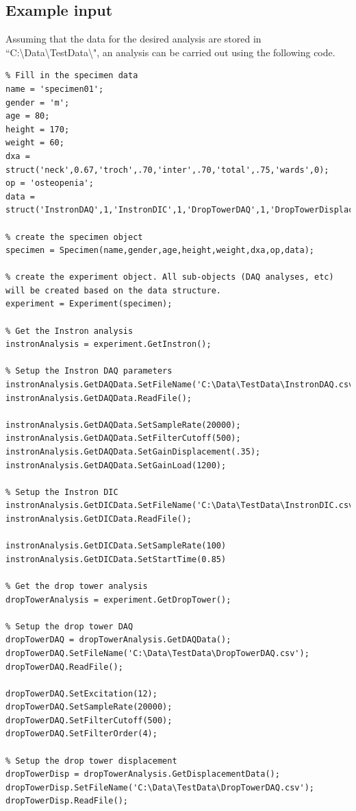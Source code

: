 \subsection{Example input}
\label{sec:code_dt_ins_analysis_example}
Assuming that the data for the desired analysis are stored in ``C:\textbackslash Data\textbackslash TestData\textbackslash", an analysis can be carried out using the following code.
\begin{singlespace}
\begin{lstlisting}
% Fill in the specimen data
name = 'specimen01';
gender = 'm';
age = 80;
height = 170;
weight = 60;
dxa = struct('neck',0.67,'troch',.70,'inter',.70,'total',.75,'wards',0);
op = 'osteopenia';
data = struct('InstronDAQ',1,'InstronDIC',1,'DropTowerDAQ',1,'DropTowerDisplacement',1,'DropTowerDIC',1);

% create the specimen object
specimen = Specimen(name,gender,age,height,weight,dxa,op,data);

% create the experiment object. All sub-objects (DAQ analyses, etc) will be created based on the data structure.
experiment = Experiment(specimen);

% Get the Instron analysis
instronAnalysis = experiment.GetInstron();

% Setup the Instron DAQ parameters
instronAnalysis.GetDAQData.SetFileName('C:\Data\TestData\InstronDAQ.csv');
instronAnalysis.GetDAQData.ReadFile();

instronAnalysis.GetDAQData.SetSampleRate(20000);
instronAnalysis.GetDAQData.SetFilterCutoff(500);
instronAnalysis.GetDAQData.SetGainDisplacement(.35);
instronAnalysis.GetDAQData.SetGainLoad(1200);

% Setup the Instron DIC
instronAnalysis.GetDICData.SetFileName('C:\Data\TestData\InstronDIC.csv');
instronAnalysis.GetDICData.ReadFile();

instronAnalysis.GetDICData.SetSampleRate(100)
instronAnalysis.GetDICData.SetStartTime(0.85)

% Get the drop tower analysis
dropTowerAnalysis = experiment.GetDropTower();

% Setup the drop tower DAQ
dropTowerDAQ = dropTowerAnalysis.GetDAQData();
dropTowerDAQ.SetFileName('C:\Data\TestData\DropTowerDAQ.csv');
dropTowerDAQ.ReadFile();

dropTowerDAQ.SetExcitation(12);
dropTowerDAQ.SetSampleRate(20000);
dropTowerDAQ.SetFilterCutoff(500);
dropTowerDAQ.SetFilterOrder(4);

% Setup the drop tower displacement
dropTowerDisp = dropTowerAnalysis.GetDisplacementData();
dropTowerDisp.SetFileName('C:\Data\TestData\DropTowerDAQ.csv');
dropTowerDisp.ReadFile();


\end{lstlisting}
\end{singlespace}
